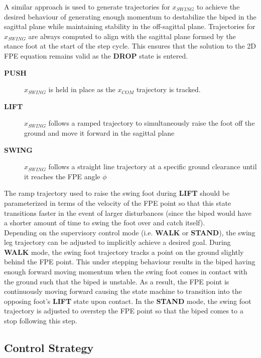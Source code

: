 A similar approach is used to generate trajectories for $x_{SWING}$ to achieve the desired behaviour of generating enough momentum to destabilize the biped in the sagittal plane while maintaining stability in the off-sagittal plane. Trajectories for $x_{SWING}$ are always computed to align with the sagittal plane formed by the stance foot at the start of the step cycle. This ensures that the solution to the 2D FPE equation remains valid as the \textbf{DROP} state is entered.

\begin{description}
	\item[\textbf{PUSH}] $x_{SWING}$ is held in place as the $x_{COM}$ trajectory is tracked.
	\item[\textbf{LIFT}] $x_{SWING}$ follows a ramped trajectory to simultaneously raise the foot off the ground and move it forward in the sagittal plane
	\item[\textbf{SWING}] $x_{SWING}$ follows a straight line trajectory at a specific ground clearance until it reaches the FPE angle $\phi$
\end{description}

The ramp trajectory used to raise the swing foot during \textbf{LIFT} should be parameterized in terms of the velocity of the FPE point so that this state transitions faster in the event of larger disturbances (since the biped would have a shorter amount of time to swing the foot over and catch itself). \\

Depending on the supervisory control mode (i.e. \textbf{WALK} or \textbf{STAND}), the swing leg trajectory can be adjusted to implicitly achieve a desired goal. During \textbf{WALK} mode, the swing foot trajectory tracks a point on the ground slightly behind the FPE point. This under stepping behaviour results in the biped having enough forward moving momentum when the swing foot comes in contact with the ground such that the biped is unstable. As a result, the FPE point is continuously moving forward causing the state machine to transition into the opposing foot's \textbf{LIFT} state upon contact. In the \textbf{STAND} mode, the swing foot trajectory is adjusted to overstep the FPE point so that the biped comes to a stop following this step.


\subsection{Control Strategy} %
\label{sub:control_strategy}

